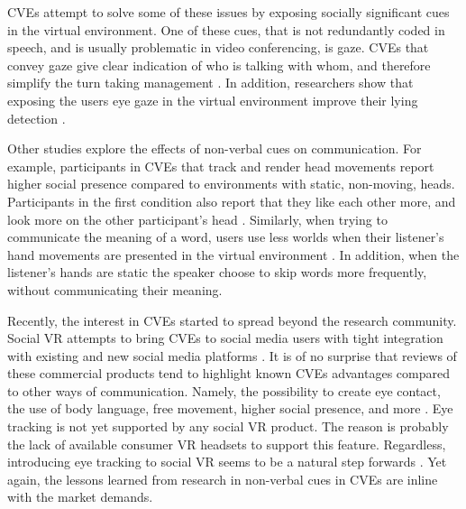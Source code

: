 \documentclass[]{simple-thesis}
\begin{document}
CVEs attempt to solve some of these issues by exposing socially significant cues in the virtual environment.
One of these cues, that is not redundantly coded in speech, and is usually problematic in video conferencing, is gaze.
CVEs that convey gaze give clear indication of who is talking with whom, and therefore simplify the turn taking management \citep{Vertegaal1999, Vertegaal2003}.
In addition, researchers show that exposing the users eye gaze in the virtual environment improve their lying detection \citep{Steptoe2010}.

Other studies explore the effects of non-verbal cues on communication.
For example, participants in CVEs that track and render head movements report higher social presence compared to environments with static, non-moving, heads.
Participants in the first condition also report that they like each other more, and look more on the other participant's head \citep{Bailenson2002}.
Similarly, when trying to communicate the meaning of a word, users use less worlds when their listener's hand movements are presented in the virtual environment \citep{Dodds2011}.
In addition, when the listener's hands are static the speaker choose to skip words more frequently, without communicating their meaning.

Recently, the interest in CVEs started to spread beyond the research community.
Social VR attempts to bring CVEs to social media users with tight integration with existing and new social media platforms \citep{Bonasio2016}.
It is of no surprise that reviews of these commercial products tend to highlight known CVEs advantages compared to other ways of communication.
Namely, the possibility to create eye contact, the use of body language, free movement, higher social presence, and more \citep{Rosedale2015}.
Eye tracking is not yet supported by any social VR product.
The reason is probably the lack of available consumer VR headsets to support this feature.
Regardless, introducing eye tracking to social VR seems to be a natural step forwards \citep{Langley2017}.
Yet again, the lessons learned from research in non-verbal cues in CVEs are inline with the market demands.
\end{document}
